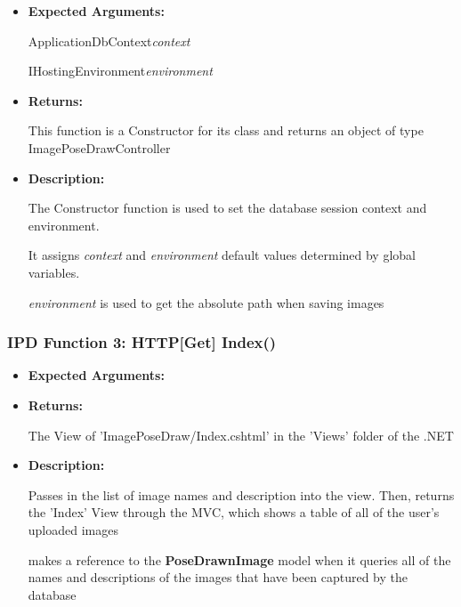 \documentclass{scrreprt}
\begin{document}
\begin{itemize}
        \item \textbf{Expected Arguments:}

                ApplicationDbContext\quad\textit{context}

                IHostingEnvironment\quad\textit{environment}

        \item \textbf{Returns:}

                This function is a Constructor for its class and returns an
                object of type ImagePoseDrawController

        \item \textbf{Description:}

                The Constructor function is used to set the database session
                context and environment.

                It assigns \textit{context} and \textit{environment} default
                values determined by global variables.

                \textit{environment} is used to get the absolute path when
                saving images
\end{itemize}


\subsubsection{IPD Function 3: HTTP[Get] Index()}

\begin{itemize}
        \item \textbf{Expected Arguments:}

        \item \textbf{Returns:}

                The View of 'ImagePoseDraw/Index.cshtml' in the 'Views' folder
                of the .NET

        \item \textbf{Description:}

                Passes in the list of image names and description into the
                view. Then, returns the 'Index' View through the MVC, which
                shows a table of all of the user's uploaded images

                makes a reference to the \textbf{PoseDrawnImage} model when it
                queries all of the names and descriptions of the images that
                have been captured by the database
\end{itemize}
\end{document}
